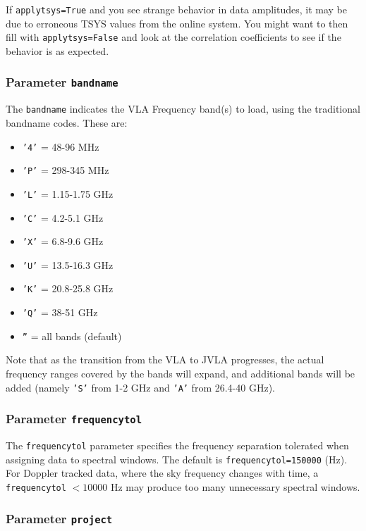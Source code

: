 If {\tt applytsys=True} and you see strange behavior in data
amplitudes, it may be due to erroneous TSYS values from the online
system.  You might want to then fill with {\tt applytsys=False} 
and look at the correlation coefficients to see if the behavior is
as expected.

\subsubsection{Parameter {\tt bandname} }
\label{section:io.import.vla.bandname}

The {\tt bandname} indicates the VLA Frequency band(s) to load,
using the traditional bandname codes.  These are:
\begin{itemize}
  \item {\tt '4'} =   48-96 MHz
  \item {\tt 'P'} =  298-345 MHz
  \item {\tt 'L'} = 1.15-1.75 GHz
  \item {\tt 'C'} =  4.2-5.1 GHz
  \item {\tt 'X'} =  6.8-9.6 GHz
  \item {\tt 'U'} = 13.5-16.3 GHz
  \item {\tt 'K'} = 20.8-25.8 GHz
  \item {\tt 'Q'} =   38-51 GHz
  \item {\tt ''}  = all bands (default)
\end{itemize}

Note that as the transition from the VLA to JVLA progresses,
the actual frequency ranges covered by the bands will expand,
and additional bands will be added (namely {\tt 'S'} from 1-2 GHz and 
{\tt 'A'} from 26.4-40 GHz).

\subsubsection{Parameter {\tt frequencytol} }
\label{section:io.import.vla.frequencytol}

The {\tt frequencytol} parameter specifies the frequency separation
tolerated when assigning data to spectral windows.  The
default is {\tt frequencytol=150000} (Hz).  
For Doppler tracked data, where the sky frequency changes with time,
a {\tt frequencytol} $< 10000$ Hz may produce too many
unnecessary spectral windows.

\subsubsection{Parameter {\tt project} }
\label{section:io.import.vla.project}

